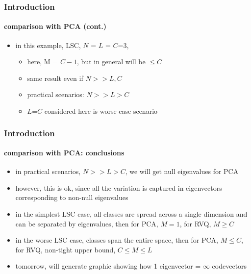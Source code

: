 \begin{frame}
\frametitle{Introduction}
\framesubtitle{comparison with PCA (cont.)}
\mypagenum
	\begin{itemize}
		\item in this example, LSC, $N$ = $L$ = $C$=3,
			\begin{itemize}
				\item here, M = $C-1$, but in general will be $\leq C$
				\item same result even if $N>>L, C$
				\item practical scenarios: $N>>L>C$
				\item $L$=$C$ considered here is worse case scenario
			\end{itemize}
	\end{itemize}
\logoCSIPCPL\mypagenum	
\end{frame}



\begin{frame}
\frametitle{Introduction}
\framesubtitle{comparison with PCA: conclusions}
	\begin{itemize}
		\item in practical scenarios, $N>>L>C$, we will get null eigenvalues for PCA
		\item however, this is ok, since all the variation is captured in eigenvectors corresponding to non-null eigenvalues
		\item in the simplest LSC case, all classes are spread across a single dimension and can be separated by eigenvalues, then for PCA, $M=1$, for RVQ, $M \geq C$
		\item in the worse LSC case, classes span the entire space, then for PCA, $M \leq C$, for RVQ, non-tight upper bound, $C \leq M \leq L$
		\item tomorrow, will generate graphic showing how 1 eigenvector = $\infty$ codevectors
	\end{itemize}
\end{frame}




